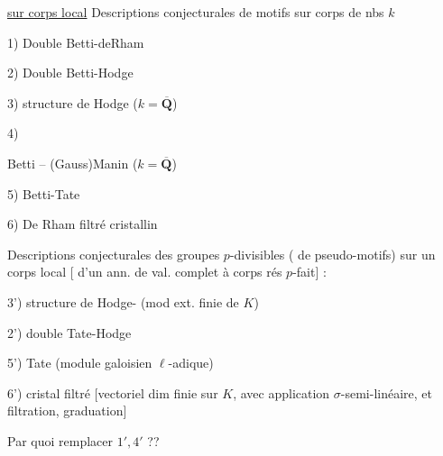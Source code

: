 \uline{sur corps local}
Descriptions conjecturales de motifs sur corps de nbs  $k$

1) Double  Betti-deRham

2) Double  Betti-Hodge

3)  structure de Hodge ($k=\overline{\mathbf Q}$)

4) 

Betti -- (Gauss)Manin \qquad ($k=\overline{\mathbf Q}$)

5)  Betti-Tate

6)  De Rham filtré cristallin

Descriptions conjecturales des groupes $p$-divisibles  ( de pseudo-motifs) sur un corps local [ d'un ann. de val.  complet à corps rés $p$-fait] :

3') structure de Hodge- (mod ext. finie de $K$)

2') double  Tate-Hodge

5') Tate (module galoisien $\ell$-adique)

6')  cristal filtré [vectoriel  dim finie sur $K$, avec application $\sigma$-semi-linéaire, et filtration, graduation]

Par quoi remplacer $1',4'$ ??

